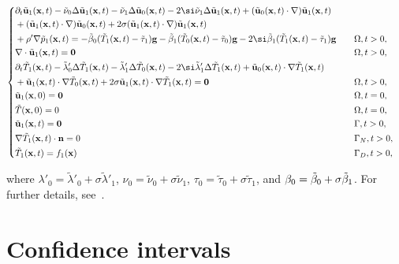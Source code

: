 \begin{equation} 
\left\lbrace
\begin{aligned}
& \partial_t \tilde{\textbf{u}}_1(\textbf{x},t)-\tilde\nu_0\Delta \tilde{\textbf{u}}_1(\textbf{x},t)-\tilde\nu_1\Delta \tilde{\textbf{u}}_0(\textbf{x},t)-2\si\tilde\nu_1\Delta \tilde{\textbf{u}}_1(\textbf{x},t)+(\tilde{\textbf{u}}_0(\textbf{x},t)\cdot\nabla)\tilde{\textbf{u}}_1(\textbf{x},t)\\ &+(\tilde{\textbf{u}}_1(\textbf{x},t)\cdot\nabla)\tilde{\textbf{u}}_0(\textbf{x},t)+2\sigma(\tilde{\textbf{u}}_1(\textbf{x},t)\cdot\nabla)\tilde{\textbf{u}}_1(\textbf{x},t)\\ &+\rho'\nabla \tilde p_1(\textbf{x},t)=-\tilde\beta_0(\tilde T_1(\textbf{x},t)-\tilde \tau_1)\textbf g -\tilde\beta_1(\tilde T_0(\textbf{x},t)-\tilde \tau_0)\textbf g-2\si\tilde\beta_1(\tilde T_1(\textbf{x},t)-\tilde \tau_1)\textbf g  && \quad \Omega,t>0,\\
& \nabla\cdot\tilde{\textbf{u}}_1(\textbf{x},t)=\textbf{0} && \quad \Omega,t>0,\\
 &\partial_t\tilde T_1(\textbf{x},t)-\tilde\lambda'_0\Delta \tilde T_1(\textbf{x},t)-\tilde\lambda'_1\Delta \tilde T_0(\textbf{x},t)-2\si\tilde\lambda'_1\Delta \tilde T_1(\textbf{x},t) +\tilde{\textbf{u}}_0(\textbf{x},t)\cdot\nabla\tilde T_1(\textbf{x},t)\\ &+\tilde{\textbf{u}}_1(\textbf{x},t)\cdot\nabla\tilde T_0(\textbf{x},t)+2\sigma\tilde{\textbf{u}}_1(\textbf{x},t)\cdot\nabla\tilde T_1(\textbf{x},t)= \textbf{0} && \quad \Omega,t>0,\\
 & \uot(\xvect, 0)= \vect && \quad \Omega,t=0,\\
   & \tilde T(\xvect, 0)= 0 && \quad \Omega,t=0,\\
 & \uot(\mathbf{x},t)=\vect && \quad \Gamma,t>0,\\
 & \nabla \Tot(\mathbf{x},t)\cdot \nvect=0 && \quad \Gamma_N,t>0,\\
 &\Tot(\mathbf{x},t)=\textcolor{black}{ f_1(\mathbf{x})} && \quad \Gamma_D,t>0,
\end{aligned}
\right.
\label{syst2_NS_T_para_u1}
\end{equation}

where $\lambda'_0= \tilde \lambda'_0+\sigma\tilde \lambda'_1$,  $\nu_0= \tilde \nu_0+\sigma\tilde \nu_1$, $\tau_0= \tilde \tau_0+\sigma\tilde \tau_1$, and $\beta_0= \tilde {\beta}_0+\sigma\tilde {\beta}_1$. For further details, see~\cite{nouaime2024sensitivity}.
 
\section{Confidence intervals}

